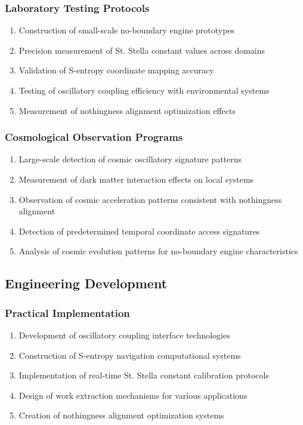 \documentclass[11pt,a4paper]{article}
\theoremstyle{remark}
\begin{document}
\subsubsection{Laboratory Testing Protocols}

\begin{enumerate}
\item Construction of small-scale no-boundary engine prototypes
\item Precision measurement of St. Stella constant values across domains
\item Validation of S-entropy coordinate mapping accuracy
\item Testing of oscillatory coupling efficiency with environmental systems
\item Measurement of nothingness alignment optimization effects
\end{enumerate}

\subsubsection{Cosmological Observation Programs}

\begin{enumerate}
\item Large-scale detection of cosmic oscillatory signature patterns
\item Measurement of dark matter interaction effects on local systems
\item Observation of cosmic acceleration patterns consistent with nothingness alignment
\item Detection of predetermined temporal coordinate access signatures
\item Analysis of cosmic evolution patterns for no-boundary engine characteristics
\end{enumerate}

\subsection{Engineering Development}

\subsubsection{Practical Implementation}

\begin{enumerate}
\item Development of oscillatory coupling interface technologies
\item Construction of S-entropy navigation computational systems
\item Implementation of real-time St. Stella constant calibration protocols
\item Design of work extraction mechanisms for various applications
\item Creation of nothingness alignment optimization systems
\end{enumerate}
\end{document}
